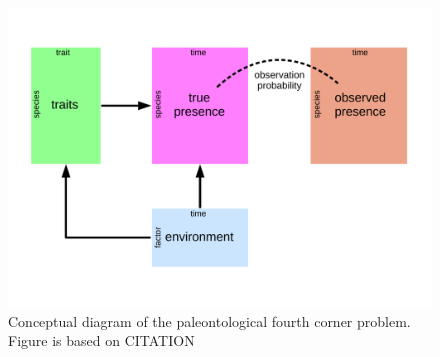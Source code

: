 \documentclass[12pt,letterpaper]{article}
\begin{document}
\begin{figure}[ht]
  \centering
  \includegraphics[width=\textwidth,height=0.8\textheight,keepaspectratio=true]{figure/paleo_fourth_corner}
  \caption{Conceptual diagram of the paleontological fourth corner problem. Figure is based on CITATION}
  \label{fig:concept_fourth_corner}
\end{figure}






\end{document}
